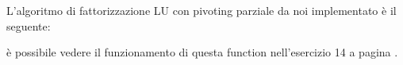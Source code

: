 \begin{flushleft}
L'algoritmo di fattorizzazione LU con pivoting parziale da noi implementato è il seguente:

è possibile vedere il funzionamento di questa function nell'esercizio 14 a pagina \pageref{es314}.
\end{flushleft}